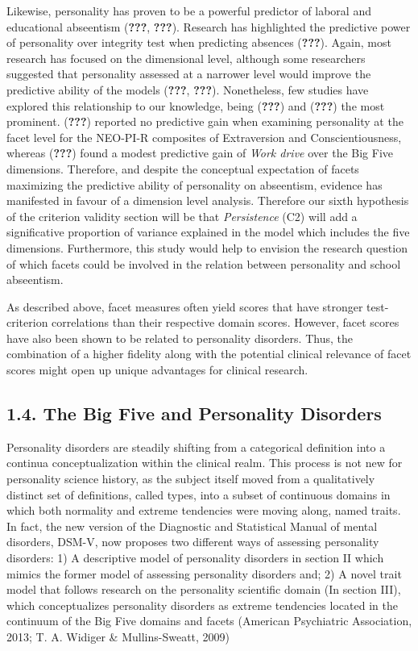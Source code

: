 \documentclass[,man,floatsintext]{apa6}
\begin{document}
Likewise, personality has proven to be a powerful predictor of laboral
and educational abseentism ({\textbf{???}}, {\textbf{???}}). Research
has highlighted the predictive power of personality over integrity test
when predicting absences ({\textbf{???}}). Again, most research has
focused on the dimensional level, although some researchers suggested
that personality assessed at a narrower level would improve the
predictive ability of the models ({\textbf{???}}, {\textbf{???}}).
Nonetheless, few studies have explored this relationship to our
knowledge, being ({\textbf{???}}) and ({\textbf{???}}) the most
prominent. ({\textbf{???}}) reported no predictive gain when examining
personality at the facet level for the NEO-PI-R composites of
Extraversion and Conscientiousness, whereas ({\textbf{???}}) found a
modest predictive gain of \emph{Work drive} over the Big Five
dimensions. Therefore, and despite the conceptual expectation of facets
maximizing the predictive ability of personality on abseentism, evidence
has manifested in favour of a dimension level analysis. Therefore our
sixth hypothesis of the criterion validity section will be that
\emph{Persistence} (C2) will add a significative proportion of variance
explained in the model which includes the five dimensions. Furthermore,
this study would help to envision the research question of which facets
could be involved in the relation between personality and school
abseentism.

As described above, facet measures often yield scores that have stronger
test-criterion correlations than their respective domain scores.
However, facet scores have also been shown to be related to personality
disorders. Thus, the combination of a higher fidelity along with the
potential clinical relevance of facet scores might open up unique
advantages for clinical research.

\subsection{1.4. The Big Five and Personality
Disorders}\label{the-big-five-and-personality-disorders}

Personality disorders are steadily shifting from a categorical
definition into a continua conceptualization within the clinical realm.
This process is not new for personality science history, as the subject
itself moved from a qualitatively distinct set of definitions, called
types, into a subset of continuous domains in which both normality and
extreme tendencies were moving along, named traits. In fact, the new
version of the Diagnostic and Statistical Manual of mental disorders,
DSM-V, now proposes two different ways of assessing personality
disorders: 1) A descriptive model of personality disorders in section II
which mimics the former model of assessing personality disorders and; 2)
A novel trait model that follows research on the personality scientific
domain (In section III), which conceptualizes personality disorders as
extreme tendencies located in the continuum of the Big Five domains and
facets (American Psychiatric Association, 2013; T. A. Widiger \&
Mullins-Sweatt, 2009)
\end{document}
